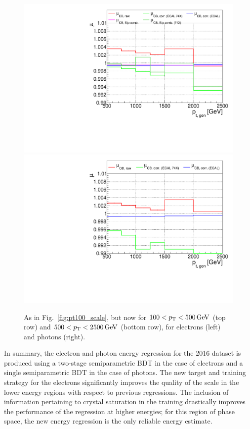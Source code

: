 \begin{figure}[hbtp]
\begin{center}
    \includegraphics[width=\halflinewidth]{img/regression/pt2500_scale_electrons.pdf}
    \includegraphics[width=\halflinewidth]{img/regression/pt2500_scale_photons.pdf}
    \caption{
        As in Fig.~\ref{fig:pt100_scale}, but now for $100 < p_\mathrm{T} < 500\,\text{GeV}$ (top row) and $500 < p_\mathrm{T} < 2500\,\text{GeV}$ (bottom row), for electrons (left) and photons (right).
        }
    \label{fig:pt2500_scale}
  \end{center}
\end{figure}


In summary, the electron and photon energy regression for the 2016 dataset is produced using a two-stage semiparametric BDT in the case of electrons and a single semiparametric BDT in the case of photons.
% 
The new target and training strategy for the electrons significantly improves the quality of the scale in the lower energy regions with respect to previous regressions.
% 
The inclusion of information pertaining to crystal saturation in the training drastically improves the performance of the regression at higher energies; for this region of phase space, the new energy regression is the only reliable energy estimate.


